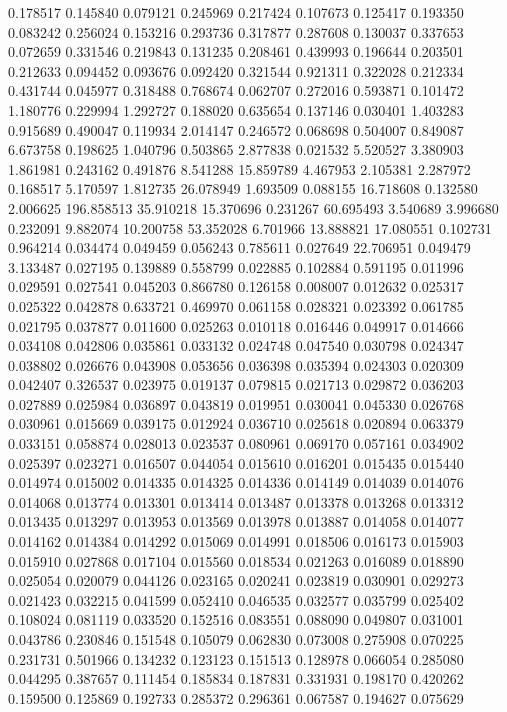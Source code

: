 0.178517
0.145840
0.079121
0.245969
0.217424
0.107673
0.125417
0.193350
0.083242
0.256024
0.153216
0.293736
0.317877
0.287608
0.130037
0.337653
0.072659
0.331546
0.219843
0.131235
0.208461
0.439993
0.196644
0.203501
0.212633
0.094452
0.093676
0.092420
0.321544
0.921311
0.322028
0.212334
0.431744
0.045977
0.318488
0.768674
0.062707
0.272016
0.593871
0.101472
1.180776
0.229994
1.292727
0.188020
0.635654
0.137146
0.030401
1.403283
0.915689
0.490047
0.119934
2.014147
0.246572
0.068698
0.504007
0.849087
6.673758
0.198625
1.040796
0.503865
2.877838
0.021532
5.520527
3.380903
1.861981
0.243162
0.491876
8.541288
15.859789
4.467953
2.105381
2.287972
0.168517
5.170597
1.812735
26.078949
1.693509
0.088155
16.718608
0.132580
2.006625
196.858513
35.910218
15.370696
0.231267
60.695493
3.540689
3.996680
0.232091
9.882074
10.200758
53.352028
6.701966
13.888821
17.080551
0.102731
0.964214
0.034474
0.049459
0.056243
0.785611
0.027649
22.706951
0.049479
3.133487
0.027195
0.139889
0.558799
0.022885
0.102884
0.591195
0.011996
0.029591
0.027541
0.045203
0.866780
0.126158
0.008007
0.012632
0.025317
0.025322
0.042878
0.633721
0.469970
0.061158
0.028321
0.023392
0.061785
0.021795
0.037877
0.011600
0.025263
0.010118
0.016446
0.049917
0.014666
0.034108
0.042806
0.035861
0.033132
0.024748
0.047540
0.030798
0.024347
0.038802
0.026676
0.043908
0.053656
0.036398
0.035394
0.024303
0.020309
0.042407
0.326537
0.023975
0.019137
0.079815
0.021713
0.029872
0.036203
0.027889
0.025984
0.036897
0.043819
0.019951
0.030041
0.045330
0.026768
0.030961
0.015669
0.039175
0.012924
0.036710
0.025618
0.020894
0.063379
0.033151
0.058874
0.028013
0.023537
0.080961
0.069170
0.057161
0.034902
0.025397
0.023271
0.016507
0.044054
0.015610
0.016201
0.015435
0.015440
0.014974
0.015002
0.014335
0.014325
0.014336
0.014149
0.014039
0.014076
0.014068
0.013774
0.013301
0.013414
0.013487
0.013378
0.013268
0.013312
0.013435
0.013297
0.013953
0.013569
0.013978
0.013887
0.014058
0.014077
0.014162
0.014384
0.014292
0.015069
0.014991
0.018506
0.016173
0.015903
0.015910
0.027868
0.017104
0.015560
0.018534
0.021263
0.016089
0.018890
0.025054
0.020079
0.044126
0.023165
0.020241
0.023819
0.030901
0.029273
0.021423
0.032215
0.041599
0.052410
0.046535
0.032577
0.035799
0.025402
0.108024
0.081119
0.033520
0.152516
0.083551
0.088090
0.049807
0.031001
0.043786
0.230846
0.151548
0.105079
0.062830
0.073008
0.275908
0.070225
0.231731
0.501966
0.134232
0.123123
0.151513
0.128978
0.066054
0.285080
0.044295
0.387657
0.111454
0.185834
0.187831
0.331931
0.198170
0.420262
0.159500
0.125869
0.192733
0.285372
0.296361
0.067587
0.194627
0.075629
